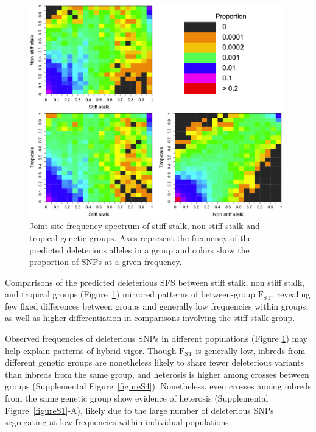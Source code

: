 \documentclass[12pt]{article}
\begin{document}
\begin{figure}[!t]
  \begin{center}
   \includegraphics[width=110mm]{joinSFS.png}
    \caption{Joint site frequency spectrum of stiff-stalk, non stiff-stalk and tropical genetic groups. Axes represent the frequency of the predicted deleterious alleles in a group and colors show the proportion of SNPs at a given frequency.}
   \label{jfs}
  \end{center}
\end{figure}

Comparisons of the predicted deleterious SFS between stiff stalk, non stiff stalk, and tropical groups (Figure~\ref{jfs}) mirrored patterns of between-group  $\mathrm{F}_{\mathrm{ST}}$, revealing few fixed differences between groups and generally low frequencies within groups, as well as higher differentiation in comparisons involving the stiff stalk group.

Observed frequencies of deleterious SNPs in different populations (Figure \ref{jfs}) may help explain patterns of hybrid vigor.  Though $\mathrm{F}_{\mathrm{ST}}$ is generally low, inbreds from different genetic groups are nonetheless likely to share fewer deleterious variants than inbreds from the same group, and heterosis is higher among crosses between groups (Supplemental Figure~\ref{figureS4}).  Nonetheless, even crosses among inbreds from the same genetic group show evidence of heterosis (Supplemental Figure~\ref{figureS1}-A), likely due to the large number of deleterious SNPs segregating at low frequencies within individual populations.   
\end{document}
